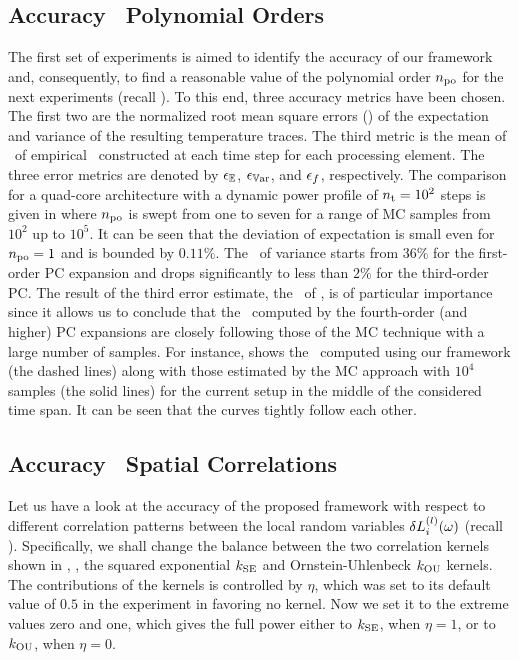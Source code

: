 \subsection{Accuracy \versus\ Polynomial Orders} 
The first set of experiments is aimed to identify the accuracy of our framework and, consequently, to find a reasonable value of the polynomial order ${n_\text{po}}$ for the next experiments (recall ).
To this end, three accuracy metrics have been chosen.
The first two are the normalized root mean square errors (\nrmses) of the expectation and variance of the resulting temperature traces.
The third metric is the mean of \nrmses\ of empirical \pdfs\ constructed at each time step for each processing element.
The three error metrics are denoted by $\epsilon_\mathbb{E}$, $\epsilon_{\mathbb{V}\text{ar}}$, and $\epsilon_f$, respectively.
The comparison for a quad-core architecture with a dynamic power profile of ${n_\text{t}} = 10^2$ steps is given in  where ${n_\text{po}}$ is swept from one to seven for a range of MC samples from $10^2$ up to $10^5$.
It can be seen that the deviation of expectation is small even for ${n_\text{po}} = 1$ and is bounded by $0.11\%$.
The \nrmse\ of variance starts from $36\%$ for the first-order PC expansion and drops significantly to less than $2\%$ for the third-order PC.
The result of the third error estimate, the \nrmses\ of \pdfs, is of particular importance since it allows us to conclude that the \pdfs\ computed by the fourth-order (and higher) PC expansions are closely following those of the MC technique with a large number of samples.
For instance,  shows the \pdfs\ computed using our framework (the dashed lines) along with those estimated by the MC approach with $10^4$ samples (the solid lines) for the current setup in the middle of the considered time span.
It can be seen that the curves tightly follow each other.


\subsection{Accuracy \versus\ Spatial Correlations}
Let us have a look at the accuracy of the proposed framework with respect to different correlation patterns between the local random variables $\delta L^{(l)}_i(\omega)$ (recall ).
Specifically, we shall change the balance between the two correlation kernels shown in , \ie, the squared exponential $\fCorr_\SE$ and Ornstein-Uhlenbeck $\fCorr_\OU$ kernels.
The contributions of the kernels is controlled by $\eta$, which was set to its default value of $0.5$ in the experiment in  favoring no kernel.
Now we set it to the extreme values zero and one, which gives the full power either to $\fCorr_\SE$, when $\eta = 1$, or to $\fCorr_\OU$, when $\eta = 0$.

